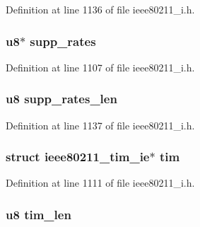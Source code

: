 Definition at line 1136 of file ieee80211\-\_\-i.\-h.

\hypertarget{structieee802__11__elems_a046b4135d5b0e0fce9a2100e81bb2cf1}{
\subsubsection[{supp\-\_\-rates}]{\setlength{\rightskip}{0pt plus 5cm}u8$\ast$ supp\-\_\-rates}}\label{structieee802__11__elems_a046b4135d5b0e0fce9a2100e81bb2cf1}


Definition at line 1107 of file ieee80211\-\_\-i.\-h.

\hypertarget{structieee802__11__elems_a10e3f296dc2be6b8aef4938abfa6af16}{
\subsubsection[{supp\-\_\-rates\-\_\-len}]{\setlength{\rightskip}{0pt plus 5cm}u8 supp\-\_\-rates\-\_\-len}}\label{structieee802__11__elems_a10e3f296dc2be6b8aef4938abfa6af16}


Definition at line 1137 of file ieee80211\-\_\-i.\-h.

\hypertarget{structieee802__11__elems_a09f63823f0fa5e1802acd5874911d07a}{
\subsubsection[{tim}]{\setlength{\rightskip}{0pt plus 5cm}struct ieee80211\-\_\-tim\-\_\-ie$\ast$ tim}}\label{structieee802__11__elems_a09f63823f0fa5e1802acd5874911d07a}


Definition at line 1111 of file ieee80211\-\_\-i.\-h.

\hypertarget{structieee802__11__elems_ab90447c07ba9f8b23a4508f5c2ab7850}{
\subsubsection[{tim\-\_\-len}]{\setlength{\rightskip}{0pt plus 5cm}u8 tim\-\_\-len}}\label{structieee802__11__elems_ab90447c07ba9f8b23a4508f5c2ab7850}


